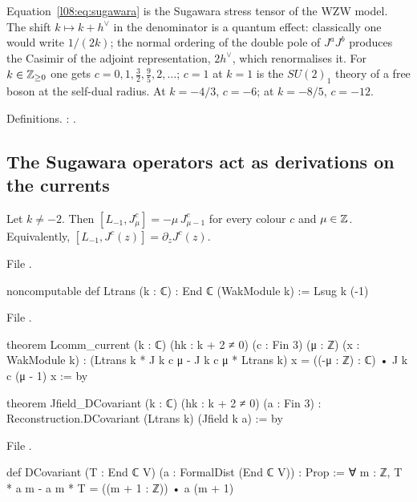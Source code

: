 \begin{physics}
Equation~\eqref{l08:eq:sugawara} is the Sugawara stress tensor of the WZW model. The shift
$k\mapsto k+h^\vee$ in the denominator is a quantum effect: classically one would write $1/(2k)$; the
normal ordering of the double pole of $J^aJ^b$ produces the Casimir of the adjoint representation,
$2h^\vee$, which renormalises it. For $k\in{\mathbb{Z}}_{\ge0}$ one gets $c = 0, 1, \frac32, \frac95, 2,\ldots$;
$c=1$ at $k=1$ is the $SU(2)_1$ theory of a free boson at the self-dual radius. At $k=-4/3$, $c=-6$; at
$k=-8/5$, $c=-12$.
\end{physics}

\begin{status}
Definitions. : \lean{[propext, Classical.}\allowbreak{}\allowbreak\lean{sound]}.
\end{status}

\subsection{The Sugawara operators act as derivations on the currents}

\begin{theorem}\label{l08:thm:Lcomm}
Let $k\ne-2$. Then $[L_{-1},J^c_\mu] = -\mu\,J^c_{\mu-1}$ for every colour $c$ and $\mu\in{\mathbb{Z}}$. Equivalently,
$[L_{-1},J^c(z)] = \partial_zJ^c(z)$.
\end{theorem}

\noindent File .
\begin{leancode}
noncomputable def Ltrans (k : ℂ) : End ℂ (WakModule k) := Lsug k (-1)
\end{leancode}
\noindent File .
\begin{leancode}
theorem Lcomm_current (k : ℂ) (hk : k + 2 ≠ 0) (c : Fin 3) (μ : ℤ) (x : WakModule k) :
    (Ltrans k * J k c μ - J k c μ * Ltrans k) x = ((-μ : ℤ) : ℂ) • J k c (μ - 1) x := by

theorem Jfield_DCovariant (k : ℂ) (hk : k + 2 ≠ 0) (a : Fin 3) :
    Reconstruction.DCovariant (Ltrans k) (Jfield k a) := by
\end{leancode}
\noindent File .
\begin{leancode}
def DCovariant (T : End ℂ V) (a : FormalDist (End ℂ V)) : Prop :=
  ∀ m : ℤ, T * a m - a m * T = ((m + 1 : ℤ)) • a (m + 1)
\end{leancode}

